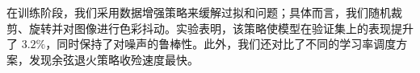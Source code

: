 在训练阶段，我们采用数据增强策略来缓解过拟和问题；具体而言，我们随机裁剪、旋转并对图像进行色彩抖动。实验表明，该策略使模型在验证集上的表现提升了 $3.2\%$，同时保持了对噪声的鲁棒性。此外，我们还对比了不同的学习率调度方案，发现余弦退火策略收殓速度最快。
